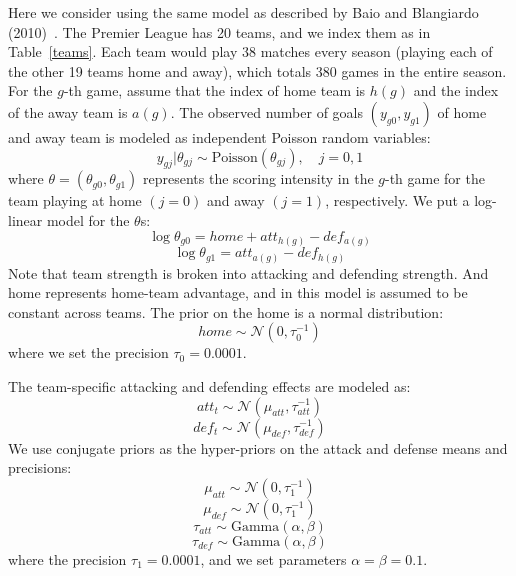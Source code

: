 \documentclass[10pt]{article}
\begin{document}
Here we consider using the same model as described by Baio and Blangiardo (2010)~\cite{doi:10.1080/02664760802684177}. The Premier League has 20 teams, and we index them as in Table~\ref{teams}. Each team would play 38 matches every season (playing each of the other 19 teams home and away), which totals 380 games in the entire season. For the $g$-th game, assume that the index of home team is $h(g)$ and the index of the away team is $a(g)$.
The observed number of goals $ (y_{g0}, y_{g1}) $ of home and away team is modeled as independent Poisson random variables:
\begin{equation}
y_{gj} | \theta_{gj} \sim \textrm{Poisson}(\theta_{gj}), \quad j = 0,1
\end{equation}
where $\theta = (\theta_{g0},\theta_{g1})$ represents the scoring intensity in the $g$-th game for the team playing at home $(j = 0)$ and away $(j = 1)$, respectively. We put a log-linear model for the $\theta$s:
\begin{equation}
\log \theta_{g0} = home + att_{h(g)} - def_{a(g)}
\end{equation}
\begin{equation}
\log \theta_{g1} = att_{a(g)} - def_{h(g)}
\end{equation}
Note that team strength is broken into attacking and defending strength. And home represents home-team advantage, and in this model is assumed to be constant across teams. The prior on the home is a normal distribution:
\begin{equation}
home \sim \mathcal{N} (0, \tau_0^{-1})
\end{equation}
where we set the precision $\tau_0 = 0.0001$.

The team-specific attacking and defending effects are modeled as:
\begin{equation}
att_t \sim \mathcal{N} (\mu_{att}, \tau_{att}^{-1})
\end{equation}
\begin{equation}
def_t \sim \mathcal{N} (\mu_{def}, \tau_{def}^{-1})
\end{equation}
We use conjugate priors as the hyper-priors on the attack and defense means and precisions:
\begin{equation}
\mu_{att} \sim \mathcal{N} (0, \tau_{1}^{-1})
\end{equation}
\begin{equation}
\mu_{def} \sim \mathcal{N} (0, \tau_{1}^{-1})
\end{equation}
\begin{equation}
\tau_{att} \sim \textrm{Gamma} (\alpha,\beta)
\end{equation}
\begin{equation}
\tau_{def} \sim \textrm{Gamma} (\alpha,\beta)
\end{equation}
where the precision $\tau_1 = 0.0001$, and we set parameters $\alpha = \beta = 0.1$.
\end{document}
